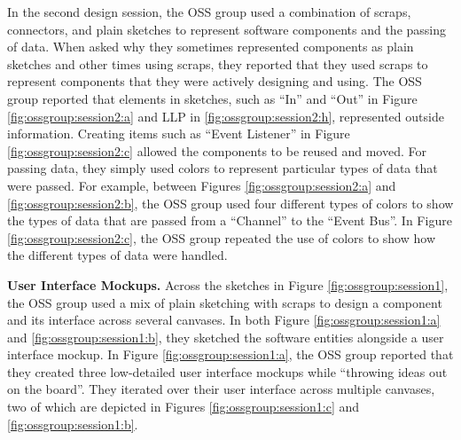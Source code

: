 \documentclass[12pt,fleqn]{ucithesis}
\begin{document}
In the second design session, the OSS group used a combination of scraps, connectors, and plain sketches to represent software components and the passing of data. When asked why they sometimes represented components as plain sketches and other times using scraps, they reported that they used scraps to represent components that they were actively designing and using. The OSS group reported that elements in sketches, such as ``In'' and ``Out'' in Figure \ref{fig:ossgroup:session2:a} and LLP in \ref{fig:ossgroup:session2:h}, represented outside information. Creating items such as ``Event Listener'' in Figure \ref{fig:ossgroup:session2:c} allowed the components to be reused and moved. For passing data, they simply used colors to represent particular types of data that were passed. For example, between Figures \ref{fig:ossgroup:session2:a} and \ref{fig:ossgroup:session2:b}, the OSS group used four different types of colors to show the types of data that are passed from a ``Channel'' to the ``Event Bus''. In Figure \ref{fig:ossgroup:session2:c}, the OSS group repeated the use of colors to show how the different types of data were handled.

\textbf{User Interface Mockups. } Across the sketches in Figure \ref{fig:ossgroup:session1}, the OSS group used a mix of plain sketching with scraps to design a component and its interface across several canvases. In both Figure \ref{fig:ossgroup:session1:a} and \ref{fig:ossgroup:session1:b}, they sketched the software entities alongside a user interface mockup. In Figure \ref{fig:ossgroup:session1:a}, the OSS group reported that they created three low-detailed user interface mockups while ``throwing ideas out on the board''. They iterated over their user interface across multiple canvases, two of which are depicted in Figures \ref{fig:ossgroup:session1:c} and \ref{fig:ossgroup:session1:b}.

\end{document}
